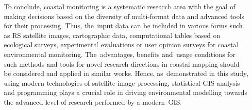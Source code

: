 \documentclass[jmse,article,accept,pdftex,oneauthor]{Definitions/mdpi}
\begin{document}
To conclude, coastal monitoring is a systematic research area with the goal of making decisions based on the diversity of multi-format data and advanced tools for their processing. Thus, the~input data can be included in various forms such as RS satellite images, cartographic data, computational tables based on ecological surveys, experimental evaluations or user opinion surveys for coastal environmental monitoring. The~advantages, benefits and~usage conditions for such methods and tools for novel research directions in coastal mapping should be considered and applied in similar works. Hence, as~demonstrated in this study, using modern technologies of satellite image processing, statistical GIS analysis and programming plays a crucial role in driving environmental modelling towards the advanced level of research performed by a modern~GIS. 

\vspace{6pt}






\end{document}
